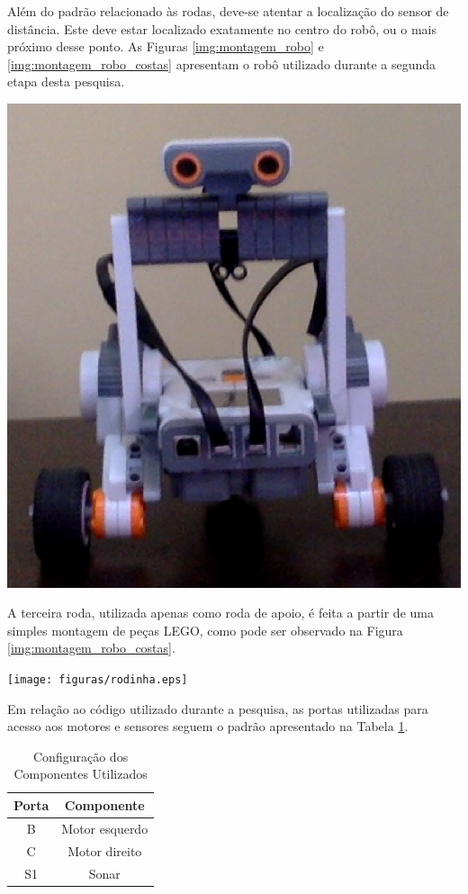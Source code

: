 	Além do padrão relacionado às rodas, deve-se atentar a localização do sensor de distância. Este deve estar localizado exatamente no centro do robô, ou o mais próximo desse ponto. As Figuras \ref{img:montagem_robo}  e \ref{img:montagem_robo_costas} apresentam o robô utilizado durante a segunda etapa desta pesquisa.

	{\centering
	\includegraphics[scale=0.5]{figuras/frente.eps}
	\label{img:montagem_robo}
	\par}

	A terceira roda, utilizada apenas como roda de apoio, é feita a partir de uma simples montagem de peças LEGO, como pode ser observado na Figura \ref{img:montagem_robo_costas}.

	{\centering
	\texttt{[image: figuras/rodinha.eps]}
	\label{img:montagem_robo_costas}
	\par}

	Em relação ao código utilizado durante a pesquisa, as portas utilizadas para acesso aos motores e sensores seguem o padrão apresentado na Tabela \ref{tab:portas_motores_sensores}.

	\begin{table}[H]
		\centering
		\caption{Configuração dos Componentes Utilizados}
		\label{tab:portas_motores_sensores}
		\begin{tabular}{|c|c|}
		\hline
		\textbf{Porta} & \textbf{Componente} \\ \hline
		B              & Motor esquerdo      \\ \hline
		C              & Motor direito       \\ \hline
		S1             & Sonar               \\ \hline
		\end{tabular}
	\end{table}

